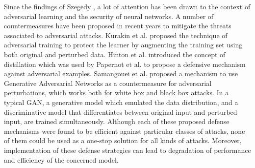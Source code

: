 Since the findings of Szegedy \cite{Szegedy13}, a lot of attention has been drawn to the context of adversarial learning and the security of neural networks. A number of countermeasures have been proposed in recent years to mitigate the threats associated to adversarial attacks. Kurakin et al. \cite{KurakinGB16} proposed the technique of adversarial training to protect the learner by augmenting the training set using both original and perturbed data. Hinton et al. \cite{HintonVD15} introduced the concept of distillation which was used by Papernot et al. \cite{PapernotMWJS16} to propose a defensive mechanism against adversarial examples. Samangouei et al. \cite{SamangoueiKC18} proposed a mechanism to use Generative Adversarial Networks as a countermeasure for adversarial perturbations, which works both for white box and black box attacks. In a typical GAN, a generative model which emulated the data distribution, and a discriminative model that differentiates between original input and perturbed input, are trained simultaneously. Although each of these proposed defense mechanisms were found to be efficient against particular classes of attacks, none of them could be used as a one-stop solution for all kinds of attacks. Moreover, implementation of these defense strategies can lead to degradation of performance and efficiency of the concerned model.